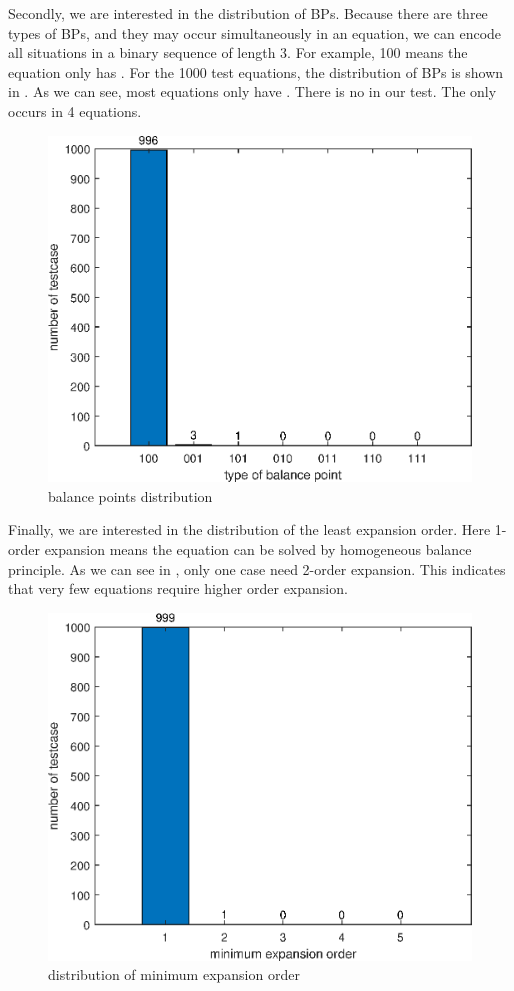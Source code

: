 Secondly, we are interested in the distribution of BPs. Because there are three types of BPs, and they may occur simultaneously in an equation, we can encode all situations in a binary sequence of length 3. For example, 100 means the equation only has \BPone{}. For the 1000 test equations, the distribution of BPs is shown in . As we can see, most equations only have \BPone{}. There is no \BPtwo{} in our test. The \BPthree{} only occurs in 4 equations.
\begin{figure}[H]
\centering
\includegraphics[width=\figwidth]{fig/nbps.eps}
\caption{balance points distribution}
\label{d-bps}
\end{figure}

Finally, we are interested in the distribution of the least expansion order. Here 1-order expansion means the equation can be solved by homogeneous balance principle. As we can see in , only one case need 2-order expansion. This indicates that very few equations require higher order expansion.
\begin{figure}[H]
\centering
\includegraphics[width=\figwidth]{fig/nexp.eps}
\caption{distribution of minimum expansion order}
\label{d-nexp}
\end{figure}

